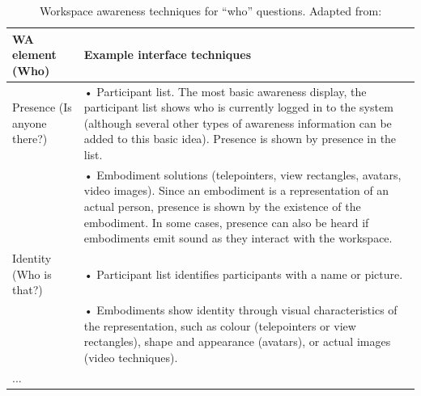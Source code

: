 \begin{table}[]
	\caption{Workspace awareness techniques for “who” questions. Adapted from: \parencite{gutwin_descriptive_2002}}
	\label{tab:watechniquesforwhoquestions}
	\begin{tabularx}{\linewidth}{lX}
		\hline
		WA element (Who)            & Example interface techniques                                                                                                                                                                                                                                                                               \\ \hline
		Presence (Is anyone there?) & • Participant list. The most basic awareness display, the participant list shows who is currently logged in to the system (although several other types of awareness information can be added to this basic idea). Presence is shown by presence in the list.                                              \\
		& • Embodiment solutions (telepointers, view rectangles, avatars, video images). Since an embodiment is a representation of an actual person, presence is shown by the existence of the embodiment. In some cases, presence can also be heard if embodiments emit sound as they interact with the workspace. \\
		Identity (Who is that?)     & • Participant list identifies participants with a name or picture.                                                                                                                                                                                                                                         \\
		& • Embodiments show identity through visual characteristics of the representation, such as colour (telepointers or view rectangles), shape and appearance (avatars), or actual images (video techniques).                                                                                                   \\
		...                         & \\ \hline                                                                                                                                                                                                                                                                                                           
	\end{tabularx}
\end{table}



